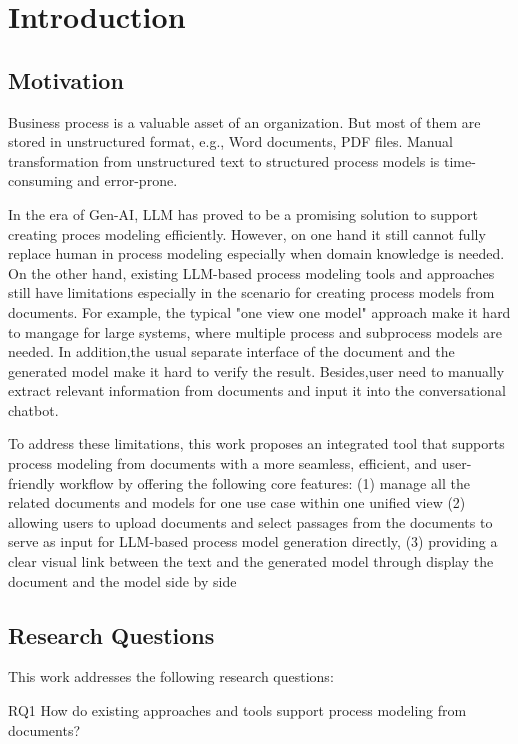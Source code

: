 \chapter{Introduction}
\label{sec:intro}

\section{Motivation}
\label{sec:intro:mo}

Business process is  a valuable asset of an organization. But most of them are stored in unstructured format, e.g., Word documents, PDF files. Manual transformation from unstructured text to structured process models is time-consuming and error-prone.

In the era of Gen-AI, LLM has proved to be a promising solution to support creating proces modeling efficiently. However, on one hand it still cannot fully replace human in process modeling especially when domain knowledge is needed. On the other hand, existing LLM-based process modeling tools and approaches still have limitations especially in the scenario for creating process models from documents. For example, the typical "one view one model" approach make it hard to mangage for large systems, where multiple process and subprocess models are needed. In addition,the usual separate interface of the document and the generated model make it hard to verify the result. Besides,user need to manually extract relevant information from documents and input it into the conversational chatbot. 

To address these limitations, this work proposes an integrated tool that supports process modeling from documents with a more seamless, efficient, and user-friendly workflow by offering the following core features: (1) manage all the related documents and models for one use case within one unified view (2) allowing users to upload documents and select passages from the documents to serve as input for LLM-based process model generation directly, (3) providing a clear visual link between the text and the generated model through display the document and the model side by side
\section{Research Questions}
\label{sec:intro:rq}

This work addresses the following research questions:

RQ1 How do existing approaches and tools support process modeling from documents?

